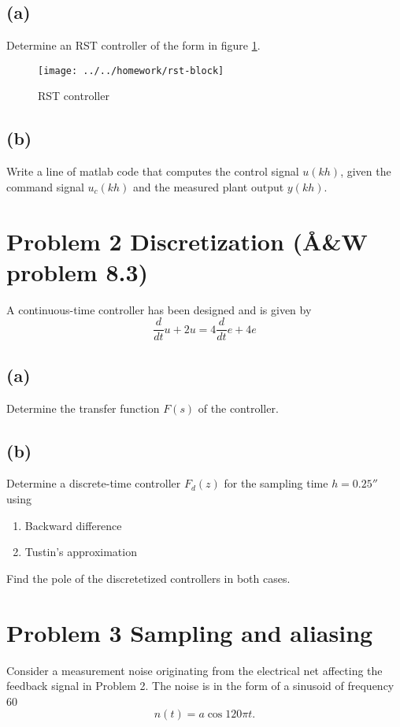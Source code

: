 \documentclass{scrartcl}
\begin{document}
\subsection*{(a)}
\label{sec:orgheadline2}
Determine an RST controller of the form in figure \ref{fig:2dof}.
\begin{figure}
\begin{center}
\texttt{[image: ../../homework/rst-block]}
\caption{RST controller}
\label{fig:2dof}
\end{center}
\end{figure}

\subsection*{(b)}
\label{sec:orgheadline3}
Write a line of matlab code that computes the control signal \(u(kh)\), given the command signal \(u_c(kh)\) and the measured plant output \(y(kh)\).

\section*{Problem 2 Discretization (Å\&W problem 8.3)}
\label{sec:orgheadline7}
A continuous-time controller has been designed and is given by 
\begin{equation}
\frac{d}{dt}u  + 2u = 4\frac{d}{dt}e + 4 e
\label{eq:de}
\end{equation}

\subsection*{(a)}
\label{sec:orgheadline5}
Determine the transfer function \(F(s)\) of the controller.
\subsection*{(b)}
\label{sec:orgheadline6}
Determine a discrete-time controller \(F_d(z)\) for the sampling time \(h=\unit{0.25}{\second}\) using 
\begin{enumerate}
\item Backward difference
\item Tustin's approximation
\end{enumerate}
Find the pole of the discretetized controllers in both cases.

\section*{Problem 3 Sampling and aliasing}
\label{sec:orgheadline10}
Consider a measurement noise originating from the electrical net affecting the feedback signal in Problem 2. The noise is in the form of a sinusoid of frequency \unit{60}{\hertz}
\begin{equation}
n(t) = a \cos 120\pi t .
\end{equation}
\end{document}
